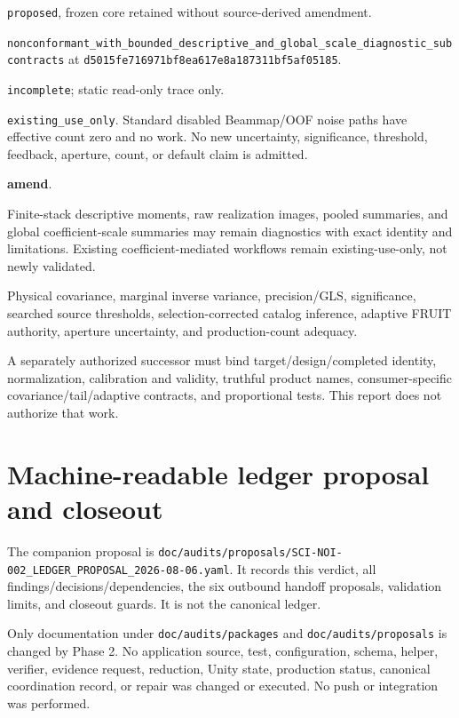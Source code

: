 \documentclass[11pt]{article}
\newcommand{\code}[1]{\nolinkurl{#1}}
\newcommand{\AuditGoverningSHA}{d5015fe716971bf8ea617e8a187311bf5af05185}
\begin{document}
\begin{description}[style=nextline]
\item[Contract status] \code{proposed}, frozen core retained without
source-derived amendment.
\item[Implementation status]
\code{nonconformant_with_bounded_descriptive_and_global_scale_diagnostic_subcontracts}
at \code{\AuditGoverningSHA}.
\item[Validation status] \code{incomplete}; static read-only trace only.
\item[Production status] \code{existing_use_only}.  Standard disabled
Beammap/OOF noise paths have effective count zero and no work.  No new
uncertainty, significance, threshold, feedback, aperture, count, or default
claim is admitted.
\item[Verdict] \textbf{amend}.
\item[Allowed/restricted consumers] Finite-stack descriptive moments, raw
realization images, pooled summaries, and global coefficient-scale summaries
may remain diagnostics with exact identity and limitations.  Existing
coefficient-mediated workflows remain existing-use-only, not newly validated.
\item[Fail-closed consumers] Physical covariance, marginal inverse variance,
precision/GLS, significance, searched source thresholds, selection-corrected
catalog inference, adaptive FRUIT authority, aperture uncertainty, and
production-count adequacy.
\item[Repair and re-audit trigger] A separately authorized successor must bind
target/design/completed identity, normalization, calibration and validity,
truthful product names, consumer-specific covariance/tail/adaptive contracts,
and proportional tests.  This report does not authorize that work.
\end{description}

\section{Machine-readable ledger proposal and closeout}

The companion proposal is
\code{doc/audits/proposals/SCI-NOI-002_LEDGER_PROPOSAL_2026-08-06.yaml}.
It records this verdict, all findings/decisions/dependencies, the six outbound
handoff proposals, validation limits, and closeout guards.  It is not the
canonical ledger.

Only documentation under \code{doc/audits/packages} and
\code{doc/audits/proposals} is changed by Phase 2.  No application source,
test, configuration, schema, helper, verifier, evidence request, reduction,
Unity state, production status, canonical coordination record, or repair was
changed or executed.  No push or integration was performed.
\end{document}
